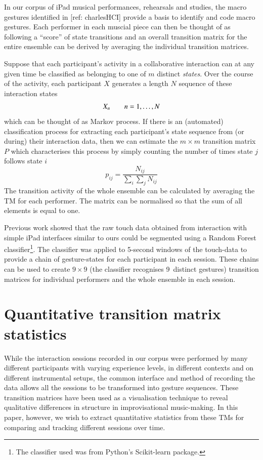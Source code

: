 \documentclass{sigchi}
\begin{document}
In our corpus of iPad musical performances, rehearsals and studies, the macro gestures identified in [ref: charlesHCI] provide a basis to identify and code macro gestures. Each performer in each muscial piece can then be thought of as following a ``score'' of state transitions and an overall transition matrix for the entire ensemble can be derived by averaging the individual transition matrices.


Suppose that each participant's activity in a collaborative
interaction can at any given time be classified as belonging to one of
$m$ distinct \emph{states}. Over the course of the activity, each
participant $X$ generates a length $N$ sequence of these interaction
states
\begin{equation}
 X_n \hskip 2em n = 1, \ldots, N
\end{equation}
which can be thought of as Markov process. If there is an
(automated) classification process for extracting each participant's
state sequence from (or during) their interaction data, then we can
estimate the $m \times m$ transition matrix $P$ which characterises
this process by simply counting the number of times state $j$ follows
state $i$
\begin{equation}
  p_{ij} = \frac{N_{ij}}{\sum_i \sum_j N_{ij}}
\end{equation}
The transition activity of the whole ensemble can be calculated by
averaging the TM for each performer. The matrix can be normalised so
that the sum of all elements is equal to one.

Previous work showed that the raw touch data obtained from interaction with simple iPad interfaces similar to ours could
be segmented  using a Random
Forest\cite{Breiman:2001kx} classifier\footnote{The classifier used
  was from Python's Scikit-learn package\cite{scikit-learn}.}. The
classifier was applied to 5-second windows of the touch-data to
provide a chain of gesture-states for each participant in each
session. These chains can be used to create $9 \times 9$ (the
classifier recognises 9~distinct gestures) transition matrices for
individual performers and the whole ensemble in each session.

\section{Quantitative transition matrix statistics}
\label{sec:underst-impr-group}

While the interaction sessions recorded in our corpus were performed
by many different participants with varying experience levels, in
different contexts and on different instrumental setups, the common
interface and method of recording the data allows all the sessions to
be transformed into gesture sequences. These transition matrices have
been used as a visualisation technique to reveal qualitative
differences in structure in improvisational
music-making\cite{Swift:2014tya}. In this paper, however, we wish to
extract quantitative statistics from these TMs for comparing and
tracking different sessions over time.
\end{document}
